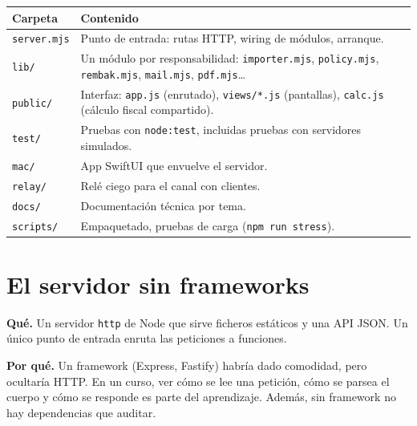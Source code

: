 {\def\LTcaptype{none} %
\begin{longtable}[]{@{}
  >{\raggedright\arraybackslash}p{}
  >{\raggedright\arraybackslash}p{}@{}}
\toprule\noalign{}
\begin{minipage}[b]{\linewidth}\raggedright
Carpeta
\end{minipage} & \begin{minipage}[b]{\linewidth}\raggedright
Contenido
\end{minipage} \\
\midrule\noalign{}
\endhead
\bottomrule\noalign{}
\endlastfoot
\texttt{server.mjs} & Punto de entrada: rutas HTTP, wiring de módulos, arranque. \\
\texttt{lib/} & Un módulo por responsabilidad: \texttt{importer.mjs}, \texttt{policy.mjs}, \texttt{rembak.mjs}, \texttt{mail.mjs}, \texttt{pdf.mjs}\ldots{} \\
\texttt{public/} & Interfaz: \texttt{app.js} (enrutado), \texttt{views/*.js} (pantallas), \texttt{calc.js} (cálculo fiscal compartido). \\
\texttt{test/} & Pruebas con \texttt{node:test}, incluidas pruebas con servidores simulados. \\
\texttt{mac/} & App SwiftUI que envuelve el servidor. \\
\texttt{relay/} & Relé ciego para el canal con clientes. \\
\texttt{docs/} & Documentación técnica por tema. \\
\texttt{scripts/} & Empaquetado, pruebas de carga (\texttt{npm\ run\ stress}). \\
\end{longtable}
}

\chapter{El servidor sin frameworks}\label{el-servidor-sin-frameworks}

\textbf{Qué.} Un servidor \texttt{http} de Node que sirve ficheros estáticos y una API JSON. Un único punto de entrada enruta las peticiones a funciones.

\textbf{Por qué.} Un framework (Express, Fastify) habría dado comodidad, pero ocultaría HTTP. En un curso, ver cómo se lee una petición, cómo se parsea el cuerpo y cómo se responde es parte del aprendizaje. Además, sin framework no hay dependencias que auditar.

